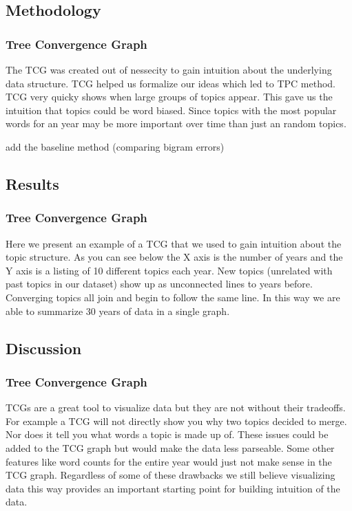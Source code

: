 \documentclass[conference]{IEEEtran}
\begin{document}
\subsection{Methodology}

\subsubsection{Tree Convergence Graph}
The TCG was created out of nessecity to gain intuition about the underlying data structure. TCG helped us formalize our ideas which led to TPC method. TCG very quicky shows when large groups of topics appear. This gave us the intuition that topics could be word biased. Since topics with the most popular words for an year may be more important over time than just an random topics.     

add the baseline method (comparing bigram errors)


\subsection{Results}
\subsubsection{Tree Convergence Graph}
Here we present an example of a TCG that we used to gain intuition about the topic structure. As you can see below the X axis is the number of years and the Y axis is a listing of 10 different topics each year. New topics (unrelated with past topics in our dataset) show up as unconnected lines to years before. Converging topics all join and begin to follow the same line. In this way we are able to summarize 30 years of data in a single graph. 


\subsection{Discussion}

\subsubsection{Tree Convergence Graph}
TCGs are a great tool to visualize data but they are not without their tradeoffs. For example a TCG will not directly show you why two topics decided to merge. Nor does it tell you what words a topic is made up of. These issues could be added to the TCG graph but would make the data less parseable. Some other features like word counts for the entire year would just not make sense in the TCG graph. Regardless of some of these drawbacks we still believe visualizing data this way provides an important starting point for building intuition of the data.
\end{document}
